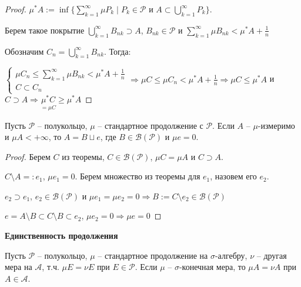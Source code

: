 \begin{proof}
    $\mu^* A:=\inf \{\sum\limits_{k=1}^\infty \mu P_k\mid P_k\in \mathcal{P}\text{ и } A\subset \bigcup\limits_{k=1}^\infty P_k\}$.

    Берем такое покрытие ${\bigcup\limits_{k=1}^\infty B_{nk}}\supset A$, $B_{nk}\in\mathcal{P}$ и $\sum\limits_{k=1}^\infty \mu B_{nk}<\mu^*A +\frac{1}{n}$

    Обозначим $C_n=\bigcup\limits_{k=1}^\infty B_{nk}$. Тогда: 
    
    $\left\{\begin{array}{l}
        \mu C_n\leq \sum\limits_{k=1}^\infty \mu B_{nk}<\mu^*A +\frac{1}{n} \\
        C\subset C_n
    \end{array}\right.\Rightarrow \mu C \leq \mu C_n < \mu^*A +\frac{1}{n}\Rightarrow
    \mu C \leq \mu^* A$ и $C\supset A\Rightarrow \underset{=\mu C}{\mu^* C}\geq \mu^* A$
\end{proof}

\begin{corollary}
    Пусть $\mathcal{P}$ – полукольцо, $\mu$ – стандартное продолжение с $\mathcal{P}$. Если $A$ – 
    $\mu$-измеримо и $\mu A<+\infty$, то $A=B\sqcup e$, где $B\in \mathcal{B}(\mathcal{P})$ и $\mu e = 0$.
\end{corollary}

\begin{proof}
    Берем $C$ из теоремы, $C\in\mathcal{B}(\mathcal{P})$, $\mu C=\mu A$ и $C\supset A$.

    $C\setminus A=:e_1$, $\mu e_1 = 0$. Берем множество из теоремы для $e_1$, назовем его $e_2$.

    $e_2\supset e_1$, $e_2\in \mathcal{B}(\mathcal{P})$ и $\mu e_1=\mu e_2=0\Rightarrow B:= C\setminus e_2\in \mathcal{B}(\mathcal{P})$

    $e=A\setminus B \subset C \setminus B \subset e_2$, $\mu e_2=0\Rightarrow\mu e=0$
\end{proof}

\begin{theorem}
    \textbf{Единственность продолжения}

    Пусть $\mathcal{P}$ – полукольцо, $\mu$ – стандартное продолжение на $\sigma$-алгебру, $\nu$ – другая мера на $\mathcal{A}$,
    т.ч. $\mu E = \nu E$ при $E\in \mathcal{P}$. Если $\mu$ – $\sigma$-конечная мера, то $\mu A = \nu A$ при $A\in \mathcal{A}$.
\end{theorem}

